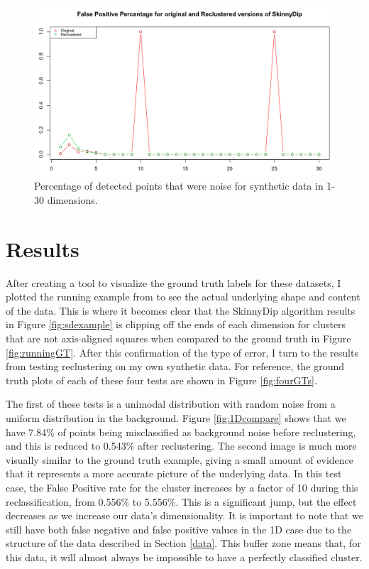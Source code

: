 \documentclass{sig-alternate-05-2015}
\begin{document}
\begin{figure}[t]
\centering
\includegraphics[width=\textwidth]{images/falseposmd}
\caption{Percentage of detected points that were noise for synthetic data in 1-30 dimensions.}
\label{fig:falseposmd}
\end{figure}


\section{Results} \label{results}
After creating a tool to visualize the ground truth labels for these datasets, I plotted the running example from \cite{skinnydip} to see the actual underlying shape and content of the data. This is where it becomes clear that the SkinnyDip algorithm results in Figure \ref{fig:sdexample} is clipping off the ends of each dimension for clusters that are not axis-aligned squares when compared to the ground truth in Figure \ref{fig:runningGT}. After this confirmation of the type of error, I turn to the results from testing reclustering on my own synthetic data. For reference, the ground truth plots of each of these four tests are shown in Figure \ref{fig:fourGTs}.

The first of these tests is a unimodal distribution with random noise from a uniform distribution in the background. Figure \ref{fig:1Dcompare} shows that we have 7.84\% of points being misclassified as background noise before reclustering, and this is reduced to 0.543\% after reclustering. The second image is much more visually similar to the ground truth example, giving a small amount of evidence that it represents a more accurate picture of the underlying data. In this test case, the False Positive rate for the cluster increases by a factor of 10 during this reclassification, from 0.556\% to 5.556\%. This is a significant jump, but the effect decreases as we increase our data's dimensionality. It is important to note that we still have both false negative and false positive values in the 1D case due to the structure of the data described in Section \ref{data}. This buffer zone means that, for this data, it will almost always be impossible to have a perfectly classified cluster.
\end{document}
